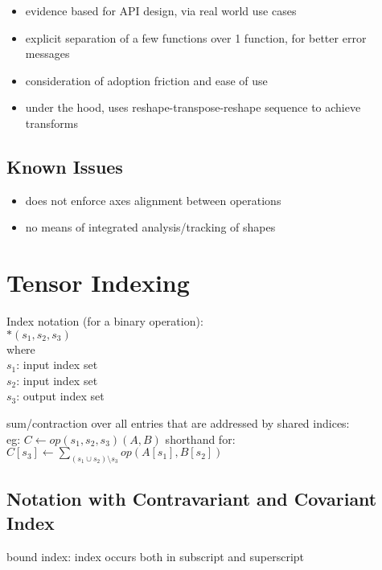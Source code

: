 \documentclass[8pt]{extarticle}
\begin{document}
\begin{multicols*}{2}
  \begin{itemize}
  \item evidence based for API design, via real world use cases
  \item explicit separation of a few functions over 1 function, for better error messages
  \item consideration of adoption friction and ease of use
  \item under the hood, uses reshape-transpose-reshape sequence to achieve transforms
  \end{itemize}

  \vfill\null
  \columnbreak
    
  \subsection{Known Issues}
  \begin{itemize}
  \item does not enforce axes alignment between operations
  \item no means of integrated analysis/tracking of shapes
  \end{itemize}
  
  \vfill\null
  \pagebreak

  \section{Tensor Indexing}

  Index notation (for a binary operation):\\
  $*(s_1,s_2,s_3)$\\
  where\\
  $s_1$: input index set\\
  $s_2$: input index set\\
  $s_3$: output index set

  sum/contraction over all entries that are addressed by shared indices:\\
  eg: $C \leftarrow op(s_1, s_2, s_3)(A,B)$ shorthand for:\\
  $C[s_3] \leftarrow \sum_{(s_1 \cup s_2) \setminus s_3} op(A[s_1], B[s_2])$

  \subsection{Notation with Contravariant and Covariant Index} 

  bound index: index occurs both in subscript and superscript


\end{multicols*}
\end{document}
